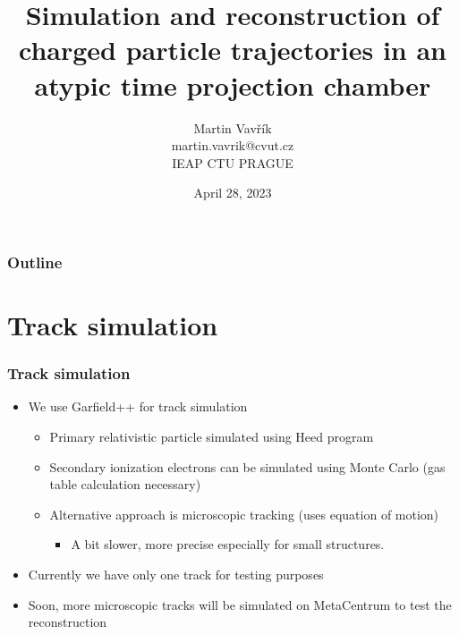 \documentclass{beamer}
\title[Atypic TPC track simul. \& reconstruction]{Simulation and reconstruction of charged particle trajectories in an atypic time projection chamber}
\author[M.~Vavřík]{\foreignlanguage{czech}{Martin Vavřík}\vspace{0.5cm}\\martin.vavrik@cvut.cz\\IEAP CTU PRAGUE\\}
\date{April 28, 2023}
\begin{document}
	
	\begin{frame}
		\titlepage
	\end{frame}
	
	\begin{frame}
		\frametitle{Outline}
		\tableofcontents
	\end{frame}
	
	\section{Track simulation}
	\begin{frame}
		\frametitle{Track simulation}
		\begin{itemize}
			\item We use Garfield++ for track simulation
			\begin{itemize}
				\item Primary relativistic particle simulated using Heed program~\cite{heed}
				\item Secondary ionization electrons can be simulated using Monte Carlo (gas table calculation necessary)
				\item Alternative approach is microscopic tracking (uses equation of motion)
				\begin{itemize}
					\item A bit slower, more precise especially for small structures.
				\end{itemize}
			\end{itemize}
			\item Currently we have only one track for testing purposes
			\item Soon, more microscopic tracks will be simulated on MetaCentrum to test the reconstruction
		\end{itemize}
	\end{frame}
	
\end{document}
